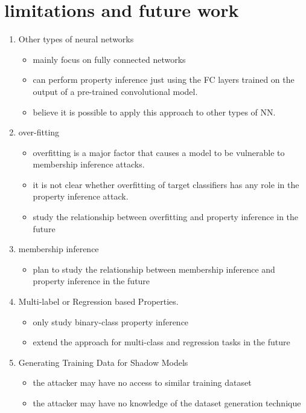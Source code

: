 \documentclass[11pt]{article}
\numberwithin{equation}{section}
\begin{document}
\section{limitations and future work}

\begin{enumerate}
    \item Other types of neural networks
    \begin{itemize}
        \item mainly focus on fully connected networks
        \item can perform property inference just using the FC layers trained on the output of a pre-trained convolutional model.
        \item believe it is possible to apply this approach to other types of NN.
    \end{itemize}
    \item over-fitting
    \begin{itemize}
        \item overfitting is a major factor that causes a model to be vulnerable to membership inference attacks.
        \item it is not clear whether overfitting of target classifiers has any role in the property inference attack.
        \item study the relationship between overfitting and property inference in the future
    \end{itemize}
    \item membership inference
    \begin{itemize}
        \item plan to study the relationship between membership inference and property inference in the future
    \end{itemize}
    \item Multi-label or Regression based Properties.
    \begin{itemize}
        \item only study binary-class property inference
        \item extend the approach for multi-class and regression tasks in the future
    \end{itemize}
    \item Generating Training Data for Shadow Models
    \begin{itemize}
        \item the attacker may have no access to similar training dataset
        \item the attacker may have no knowledge of the dataset generation technique
    \end{itemize}
\end{enumerate}
\end{document}

